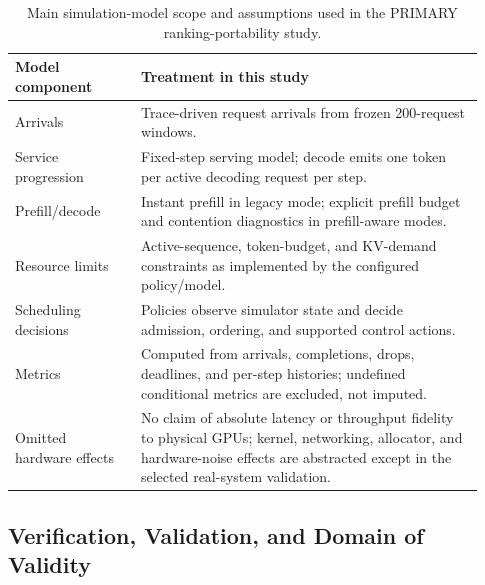 \begin{table}[t]
\centering
\caption{Main simulation-model scope and assumptions used in the PRIMARY
ranking-portability study.}
\label{tab:model-assumptions}
\small
\begin{tabular}{p{0.25\linewidth}p{0.68\linewidth}}
\toprule
Model component & Treatment in this study \\
\midrule
Arrivals & Trace-driven request arrivals from frozen 200-request windows. \\
Service progression & Fixed-step serving model; decode emits one token per active decoding request per step. \\
Prefill/decode & Instant prefill in legacy mode; explicit prefill budget and contention diagnostics in prefill-aware modes. \\
Resource limits & Active-sequence, token-budget, and KV-demand constraints as implemented by the configured policy/model. \\
Scheduling decisions & Policies observe simulator state and decide admission, ordering, and supported control actions. \\
Metrics & Computed from arrivals, completions, drops, deadlines, and per-step histories; undefined conditional metrics are excluded, not imputed. \\
Omitted hardware effects & No claim of absolute latency or throughput fidelity to physical GPUs; kernel, networking, allocator, and hardware-noise effects are abstracted except in the selected real-system validation. \\
\bottomrule
\end{tabular}
\end{table}

\subsection{Verification, Validation, and Domain of Validity}
\label{sec:vv-structure}

